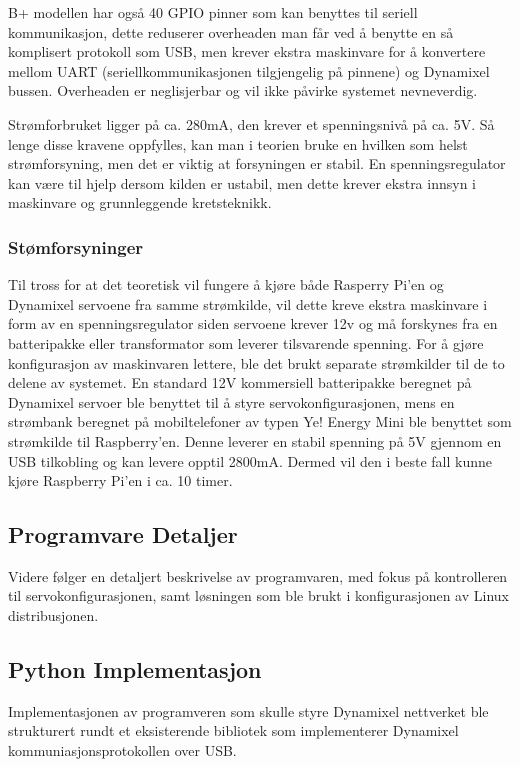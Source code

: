 \documentclass[12pt]{report}
\begin{document}
B+ modellen har også 40 GPIO pinner som kan benyttes til seriell kommunikasjon, dette reduserer overheaden man får ved å benytte en så komplisert protokoll som USB, men krever ekstra maskinvare for å konvertere mellom UART (seriellkommunikasjonen tilgjengelig på pinnene) og Dynamixel bussen. Overheaden er neglisjerbar og vil ikke påvirke systemet nevneverdig.

Strømforbruket ligger på ca. 280mA, den krever et spenningsnivå på ca. 5V. Så lenge disse kravene oppfylles, kan man i teorien bruke en hvilken som helst strømforsyning, men det er viktig at forsyningen er stabil. En spenningsregulator kan være til hjelp dersom kilden er ustabil, men dette krever ekstra innsyn i maskinvare og grunnleggende kretsteknikk.

\subsubsection{Stømforsyninger}
Til tross for at det teoretisk vil fungere å kjøre både Rasperry Pi’en og Dynamixel servoene fra samme strømkilde, vil dette kreve ekstra maskinvare i form av en spenningsregulator siden servoene krever 12v og må forskynes fra en batteripakke eller transformator som leverer tilsvarende spenning. For å gjøre konfigurasjon av maskinvaren lettere, ble det brukt separate strømkilder til de to delene av systemet. En standard 12V kommersiell batteripakke beregnet på Dynamixel servoer ble benyttet til å styre servokonfigurasjonen, mens en strømbank beregnet på mobiltelefoner av typen Ye! Energy Mini\cite{Energybank} ble benyttet som strømkilde til Raspberry’en. Denne leverer en stabil spenning på 5V gjennom en USB tilkobling og kan levere opptil 2800mA. Dermed vil den i beste fall kunne kjøre Raspberry Pi’en i ca. 10 timer.

\subsection{Programvare Detaljer}
Videre følger en detaljert beskrivelse av programvaren, med fokus på kontrolleren til servokonfigurasjonen, samt løsningen som ble brukt i konfigurasjonen av Linux distribusjonen.

\subsection{Python Implementasjon}
Implementasjonen av programveren som skulle styre Dynamixel nettverket ble strukturert rundt et eksisterende bibliotek som implementerer Dynamixel kommuniasjonsprotokollen over USB\cite{DynaCommProt}.
\end{document}

